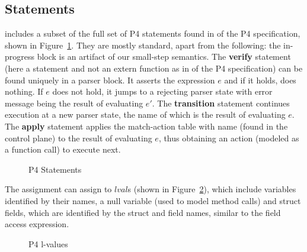 \documentclass[UTF8]{article}
\begin{document}
\newpage
\subsection{Statements}

\label{ssec:stmt}
\pfott{} includes a subset of the full set of P4 statements found in  of the P4 specification, shown in Figure~\ref{fig:stmt}. They are mostly standard, apart from the following: the in-progress block is an artifact of our small-step semantics. The \textbf{verify} statement (here a statement and not an extern function as in  of the P4 specification) can be found uniquely in a parser block. It asserts the expression $e$ and if it holds, does nothing. If $e$ does not hold, it jumps to a rejecting parser state with error message being the result of evaluating $e'$. The \textbf{transition} statement continues execution at a new parser state, the name of which is the result of evaluating $e$. The \textbf{apply} statement applies the match-action table with name \tn{} (found in the control plane) to the result of evaluating $e$, thus obtaining an action (modeled as a function call) to execute next.

\begin{figure}[h!]
\centering\ottgrammartabular{
\ottstmt\ottafterlastrule
}
\caption{P4 Statements}
\label{fig:stmt}
\end{figure}

The assignment can assign to $lval$s (shown in Figure~\ref{fig:lval}), which include variables identified by their names, a null variable (used to model method calls) and struct fields, which are identified by the struct and field names, similar to the field access expression.

\begin{figure}[h!]
\centering\ottgrammartabular{
\ottlval\ottafterlastrule
}
\caption{P4 l-values}
\label{fig:lval}
\end{figure}

\newpage
\newcommand{\exstate}{\ensuremath{s}}
\newcommand{\scope}{\ensuremath{\mathit{scope}}}
\newcommand{\stacks}{\ensuremath{\sigma}}
\newcommand{\currsf}{\ensuremath{\varepsilon}}
\newcommand{\gscope}{\ensuremath{{\gamma}_G}}
\newcommand{\escope}{\ensuremath{{\gamma}_{\emptyset}}}
\newcommand{\cstack}{E}
\newcommand{\status}{\ensuremath{t}}
\newcommand{\running}{\textbf{R}}
\newcommand{\returnst}[1]{\ensuremath{\textbf{Ret}\,\,#1}}
\newcommand{\accept}{\textbf{Accept}}
\newcommand{\reject}[1]{\textbf{Reject} #1}
\newcommand{\trans}[1]{\textbf{Trans} #1}
\newcommand{\sterr}{\ensuremath{\bot}}
\newcommand{\pfin}{\ensuremath{p_{\mathrm{fin}}}}
\end{document}
